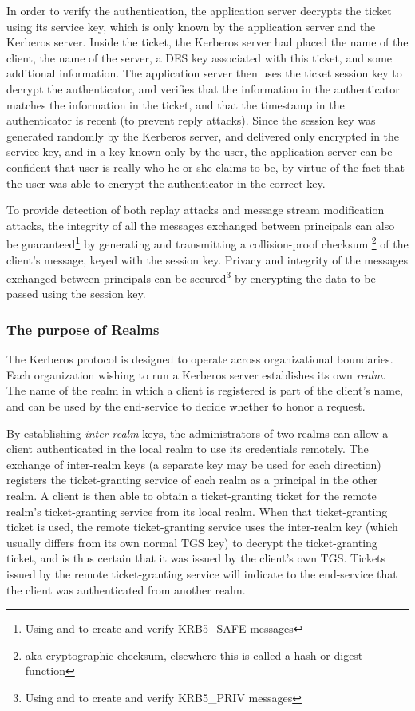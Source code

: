 In order to verify the authentication, the application server decrypts
the ticket using its service key, which is only known by the application
server and the Kerberos server.  Inside the ticket, the Kerberos server
had placed the name of the client, the name of the server, a DES key
associated with this ticket, and some additional information.  The
application server then uses the ticket session key to decrypt the
authenticator, and verifies that the information in the authenticator
matches the information in the ticket, and that the timestamp in the
authenticator is recent (to prevent reply attacks).  Since the session
key was generated randomly by the Kerberos server, and delivered only
encrypted in the service key, and in a key known only by the user, the
application server can be confident that user is really who he or she
claims to be, by virtue of the fact that the user was able to encrypt
the authenticator in the correct key.

To provide detection of both replay
attacks and message stream modification attacks, the integrity of all
the messages exchanged between principals can also be 
guaranteed\footnote{Using
 and  to create and
verify KRB5_SAFE messages} by generating and transmitting a
collision-proof checksum \footnote{aka cryptographic checksum,
elsewhere this is called a hash or digest function} of the client's
message, keyed with the session key.  Privacy and integrity of the
messages exchanged between principals can be secured\footnote{Using
 and  to create and
verify KRB5_PRIV messages} by encrypting the data to be passed using
the session key.

\subsubsection{The purpose of Realms}

The Kerberos protocol is designed to operate across organizational
boundaries.   Each organization wishing to run a Kerberos
server establishes its own {\em realm}.  The name of the realm in which a
client is registered is part of the client's name, and can be used by the
end-service to decide whether to honor a request.

By establishing {\em inter-realm} keys, the administrators of two
realms can allow a client authenticated in the local realm to use its
credentials remotely.  The exchange of inter-realm keys (a separate
key may be used for each direction) registers the ticket-granting
service of each realm as a principal in the other realm.  A client is
then able to obtain a ticket-granting ticket for the remote realm's
ticket-granting service from its local realm.  When that
ticket-granting ticket is used, the remote ticket-granting service
uses the inter-realm key (which usually differs from its own normal
TGS key) to decrypt the ticket-granting ticket, and is thus certain
that it was issued by the client's own TGS. Tickets issued by the
remote ticket-granting service will indicate to the end-service that
the client was authenticated from another realm.   


